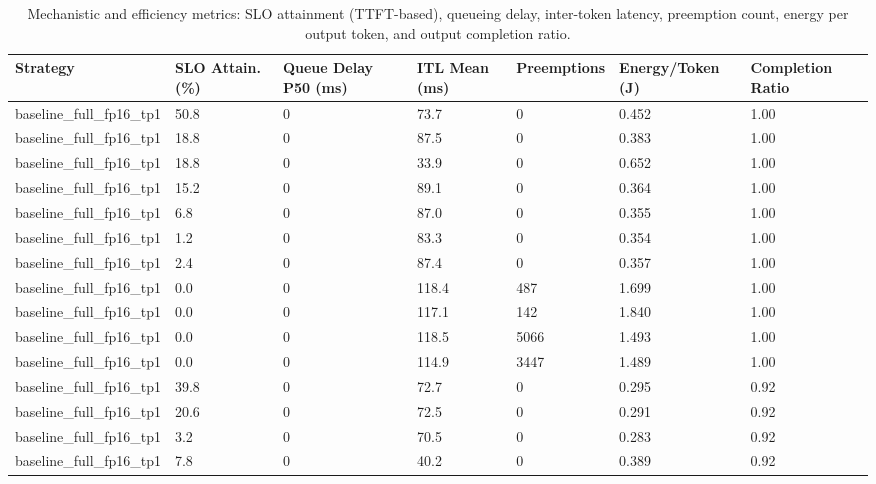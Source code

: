 \begin{table}
\caption{Mechanistic and efficiency metrics: SLO attainment (TTFT-based), queueing delay, inter-token latency, preemption count, energy per output token, and output completion ratio.}
\label{tab:efficiency}
\begin{tabular}{lllllll}
\toprule
Strategy & SLO Attain. (\%) & Queue Delay P50 (ms) & ITL Mean (ms) & Preemptions & Energy/Token (J) & Completion Ratio \\
\midrule
baseline\_full\_fp16\_tp1 & 50.8 & 0 & 73.7 & 0 & 0.452 & 1.00 \\
baseline\_full\_fp16\_tp1 & 18.8 & 0 & 87.5 & 0 & 0.383 & 1.00 \\
baseline\_full\_fp16\_tp1 & 18.8 & 0 & 33.9 & 0 & 0.652 & 1.00 \\
baseline\_full\_fp16\_tp1 & 15.2 & 0 & 89.1 & 0 & 0.364 & 1.00 \\
baseline\_full\_fp16\_tp1 & 6.8 & 0 & 87.0 & 0 & 0.355 & 1.00 \\
baseline\_full\_fp16\_tp1 & 1.2 & 0 & 83.3 & 0 & 0.354 & 1.00 \\
baseline\_full\_fp16\_tp1 & 2.4 & 0 & 87.4 & 0 & 0.357 & 1.00 \\
baseline\_full\_fp16\_tp1 & 0.0 & 0 & 118.4 & 487 & 1.699 & 1.00 \\
baseline\_full\_fp16\_tp1 & 0.0 & 0 & 117.1 & 142 & 1.840 & 1.00 \\
baseline\_full\_fp16\_tp1 & 0.0 & 0 & 118.5 & 5066 & 1.493 & 1.00 \\
baseline\_full\_fp16\_tp1 & 0.0 & 0 & 114.9 & 3447 & 1.489 & 1.00 \\
baseline\_full\_fp16\_tp1 & 39.8 & 0 & 72.7 & 0 & 0.295 & 0.92 \\
baseline\_full\_fp16\_tp1 & 20.6 & 0 & 72.5 & 0 & 0.291 & 0.92 \\
baseline\_full\_fp16\_tp1 & 3.2 & 0 & 70.5 & 0 & 0.283 & 0.92 \\
baseline\_full\_fp16\_tp1 & 7.8 & 0 & 40.2 & 0 & 0.389 & 0.92 \\
\bottomrule
\end{tabular}
\end{table}
